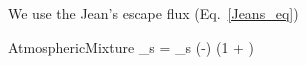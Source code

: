 We use the Jean's escape flux (Eq.~\ref{Jeans_eq})
\begin{equationCode}{AtmosphericMixture}
\Jeans_s = \conc_s 
           \exp\left(-\right)
           \left(1 + \right)
\label{Jeans_eq}
\end{equationCode}
